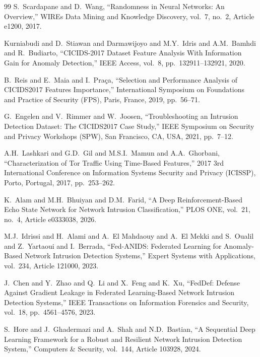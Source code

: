 \documentclass[5p,times]{elsarticle}
\begin{document}
\begin{thebibliography}{99}
		S.\ Scardapane and D.\ Wang,
		``Randomness in Neural Networks: An Overview,''
		WIREs Data Mining and Knowledge Discovery,
		vol.\ 7,
		no.\ 2,
		Article e1200,
		2017.
		
		Kurniabudi and D.\ Stiawan and Darmawijoyo and M.Y.\ Idris and A.M.\ Bamhdi and R.\ Budiarto,
		``CICIDS-2017 Dataset Feature Analysis With Information Gain for Anomaly Detection,''
		IEEE Access,
		vol.\ 8,
		pp.\ 132911--132921,
		2020.
		
		B.\ Reis and E.\ Maia and I.\ Praça,
		``Selection and Performance Analysis of CICIDS2017 Features Importance,''
		International Symposium on Foundations and Practice of Security (FPS),
		Paris, France,
		2019,
		pp.\ 56--71.
		
		G.\ Engelen and V.\ Rimmer and W.\ Joosen,
		``Troubleshooting an Intrusion Detection Dataset: The CICIDS2017 Case Study,''
		IEEE Symposium on Security and Privacy Workshops (SPW),
		San Francisco, CA, USA,
		2021,
		pp.\ 7--12.
		
		A.H.\ Lashkari and G.D.\ Gil and M.S.I.\ Mamun and A.A.\ Ghorbani,
		``Characterization of Tor Traffic Using Time-Based Features,''
		2017 3rd International Conference on Information Systems Security and Privacy (ICISSP),
		Porto, Portugal,
		2017,
		pp.\ 253--262.
		
		K.\ Alam and M.H.\ Bhuiyan and D.M.\ Farid,
		``A Deep Reinforcement-Based Echo State Network for Network Intrusion Classification,''
		PLOS ONE,
		vol.\ 21,
		no.\ 4,
		Article e0333038,
		2026.
		
		M.J.\ Idrissi and H.\ Alami and A.\ El Mahdaouy and A.\ El Mekki and S.\ Oualil and Z.\ Yartaoui and I.\ Berrada,
		``Fed-ANIDS: Federated Learning for Anomaly-Based Network Intrusion Detection Systems,''
		Expert Systems with Applications,
		vol.\ 234,
		Article 121000,
		2023.
		
		J.\ Chen and Y.\ Zhao and Q.\ Li and X.\ Feng and K.\ Xu,
		``FedDef: Defense Against Gradient Leakage in Federated Learning-Based Network Intrusion Detection Systems,''
		IEEE Transactions on Information Forensics and Security,
		vol.\ 18,
		pp.\ 4561--4576,
		2023.
		
		S.\ Hore and J.\ Ghadermazi and A.\ Shah and N.D.\ Bastian,
		``A Sequential Deep Learning Framework for a Robust and Resilient Network Intrusion Detection System,''
		Computers \& Security,
		vol.\ 144,
		Article 103928,
		2024.
		

\end{thebibliography}
\end{document}
